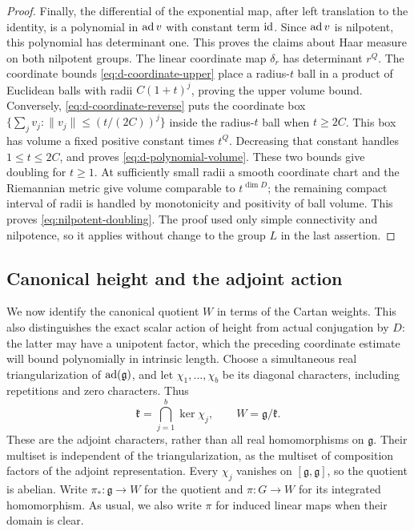 \begin{proof}
Finally, the differential of the exponential map, after left translation
to the identity, is a polynomial in $\operatorname{ad} v$ with constant term $\operatorname{id}$.
Since $\operatorname{ad} v$ is nilpotent, this polynomial has determinant one.  This proves the
claims about Haar measure on both nilpotent groups.  The linear
coordinate map $\delta_r$ has determinant $r^Q$.  The coordinate bounds
\eqref{eq:d-coordinate-upper} place a radius-$t$ ball in a product of
Euclidean balls with radii $C(1+t)^j$, proving the upper volume bound.
Conversely, \eqref{eq:d-coordinate-reverse} puts the coordinate box
$\{\sum_jv_j:\|v_j\|\le(t/(2C))^j\}$ inside the radius-$t$ ball
when $t\ge2C$.  This box has volume a fixed positive constant times
$t^Q$.  Decreasing that constant handles $1\le t\le2C$, and proves
\eqref{eq:d-polynomial-volume}.  These two bounds give doubling for
$t\ge1$.  At sufficiently small radii a smooth coordinate chart and
the Riemannian metric give volume comparable to $t^{\dim D}$; the
remaining compact interval of radii is handled by monotonicity and
positivity of ball volume.  This proves
\eqref{eq:nilpotent-doubling}.  The proof used only simple connectivity
and nilpotence, so it applies without change to the group $L$ in the
last assertion.
\end{proof}

\subsection{Canonical height and the adjoint action}

We now identify the canonical quotient $W$ in terms of the Cartan weights.
This also distinguishes the exact scalar action of height from actual
conjugation by $D$: the latter may have a unipotent factor, which the
preceding coordinate estimate will bound polynomially in intrinsic length.
Choose a simultaneous real
triangularization of $\operatorname{ad}(\mathfrak g)$, and let $\chi_1,\ldots,\chi_b$
be its diagonal characters, including repetitions and zero characters.
Thus
\[
 \mathfrak k=\bigcap_{j=1}^b\ker\chi_j,\qquad W=\mathfrak g/\mathfrak k.
\]
These are the adjoint characters, rather than all real homomorphisms
on $\mathfrak g$.  Their multiset is independent of the triangularization,
as the multiset of composition factors of the adjoint representation.
Every $\chi_j$ vanishes on $[\mathfrak g,\mathfrak g]$, so the quotient
is abelian.  Write $\pi_*:\mathfrak g\to W$ for the quotient and
$\pi:G\to W$ for its integrated homomorphism.  As usual, we also write
$\pi$ for induced linear maps when their domain is clear.

